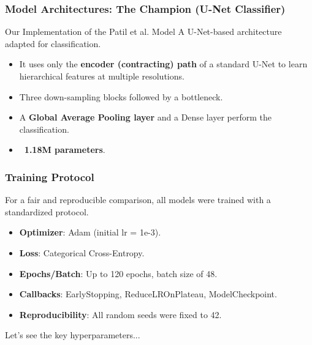 \documentclass{beamer}
\begin{document}
\begin{frame}
    \frametitle{Model Architectures: The Champion (U-Net Classifier)}
    \begin{block}{Our Implementation of the Patil et al. Model}
        A U-Net-based architecture adapted for classification.
    \end{block}
    \begin{itemize}
        \item It uses only the \textbf{encoder (contracting) path} of a standard U-Net to learn hierarchical features at multiple resolutions.
        \item Three down-sampling blocks followed by a bottleneck.
        \item A \textbf{Global Average Pooling layer} and a Dense layer perform the classification.
        \item \textbf{~1.18M parameters}.
    \end{itemize}
\end{frame}

\begin{frame}
    \frametitle{Training Protocol}
    For a fair and reproducible comparison, all models were trained with a standardized protocol.
    \begin{itemize}
        \item \textbf{Optimizer}: Adam (initial lr = 1e-3).
        \item \textbf{Loss}: Categorical Cross-Entropy.
        \item \textbf{Epochs/Batch}: Up to 120 epochs, batch size of 48.
        \item \textbf{Callbacks}: EarlyStopping, ReduceLROnPlateau, ModelCheckpoint.
        \item \textbf{Reproducibility}: All random seeds were fixed to 42.
    \end{itemize}
    Let's see the key hyperparameters...
\end{frame}
\end{document}
